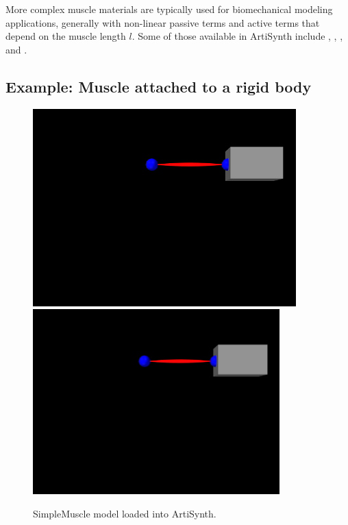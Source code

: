 More complex muscle materials are typically used for biomechanical
modeling applications, generally with non-linear passive terms and
active terms that depend on the muscle length $l$.  Some of those
available in ArtiSynth include
,
,
, and
.


\subsection{Example: Muscle attached to a rigid body}
\label{SimpleMuscleExample:sec}

\begin{figure}[ht]
\begin{center}
\iflatexml
 \includegraphics[]{images/SimpleMuscle}
\else
 \includegraphics[width=3.75in]{images/SimpleMuscle}
\fi
\end{center}
\caption{SimpleMuscle model loaded into ArtiSynth.}
\label{SimpleMuscle:fig}
\end{figure}

